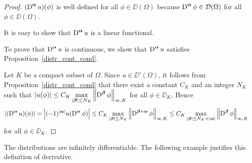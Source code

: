 \begin{proof}
 $\displaystyle (\operatorname{D}^{{\bm{\alpha}}} u)(\phi)$ is well defined for all
$\phi \in \DD(\Omega)$ because
$\displaystyle \operatorname{D}^{{\bm{\alpha}}} \phi \in \mathcal{D}(\Omega)$
for all $\phi\in \DD(\Omega)$.

 It is easy to show that $\displaystyle \operatorname{D}^{{\bm{\alpha}}} u$ is a
linear functional.

 To prove that $\displaystyle \operatorname{D}^{{\bm{\alpha}}} u$ is
continuous, we show that $\displaystyle \operatorname{D}^{{\bm{\alpha}}} u$ satisfies
Proposition~\ref{distr_cont_cond}.

Let $K$ be a compact subset of $\Omega$.  Since $u\in \DD'(\Omega)$,
it follows from Proposition~\ref{distr_cont_cond} that there exist a
constant $C_K$ and an integer $N_K$ such that
$\displaystyle \left| u(\phi) \right| \leq C_K \max_{|{\bm{\beta}}|\leq N_K}
\left\| \operatorname{D}^{{\bm{\beta}}} \phi \right\|_{\infty,K}$
for all $\phi \in \DD_K$.  Hence
\[
\left| (\operatorname{D}^{{\bm{\alpha}}} u)(\phi) \right| =
  \left| (-1)^{|{\bm{\alpha}}|} u(\operatorname{D}^{{\bm{\alpha}}} \phi) \right|
\leq C_K \max_{|{\bm{\beta}}|\leq N_K}
\left\| \operatorname{D}^{{\bm{\beta}}+{\bm{\alpha}}} \phi \right\|_{\infty,K}
\leq C_K \max_{|{\bm{\beta}}|\leq N_K+|{\bm{\alpha}}|}
\left\| \operatorname{D}^{{\bm{\beta}}} \phi \right\|_{\infty,K}
\]
for all $\phi \in \DD_K$.
\end{proof}

The distributions are infinitely differentiable.  The following
example justifies this definition of derivative. 

